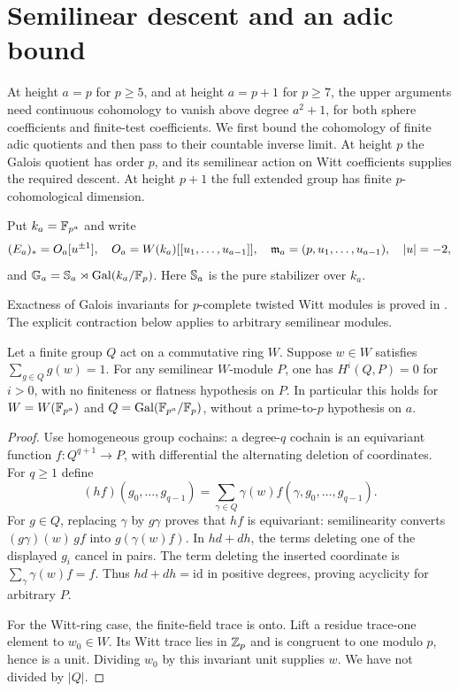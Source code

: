 \section{Semilinear descent and an adic bound}\label{sec:adic}
At height $a=p$ for $p\geq5$, and at height $a=p+1$ for $p\geq7$,
the upper arguments need continuous cohomology to vanish above degree
$a^2+1$, for both sphere coefficients
and finite-test coefficients. We first bound the cohomology of finite
adic quotients and then pass to their countable inverse limit. At height
$p$ the Galois quotient has order $p$, and its semilinear action on Witt
coefficients supplies the required descent. At height $p+1$ the full
extended group has finite $p$-cohomological dimension.

Put $k_a=\mathbb F_{p^a}$ and write
\[
 (E_a)_*=O_a[u^{\pm1}],\quad
 O_a=W(k_a)[[u_1,\ldots,u_{a-1}]],\quad
 \mathfrak m_a=(p,u_1,\ldots,u_{a-1}),\quad |u|=-2,
\]
and $\mathbb G_a=\mathbb S_a\rtimes\operatorname{Gal}(k_a/\mathbb F_p)$. Here $\mathbb S_a$ is the
pure stabilizer over $k_a$.

Exactness of Galois invariants for $p$-complete twisted Witt modules is
proved in \cite[Lemma~1.14]{goerss-hopkins2020}. The explicit contraction
below applies to arbitrary semilinear modules.

\begin{lemma}\label{lem:semilinear}
Let a finite group $Q$ act on a commutative ring $W$. Suppose
$w\in W$ satisfies $\sum_{g\in Q}g(w)=1$. For any semilinear
$W$-module $P$, one has $H^i(Q,P)=0$ for $i>0$, with no finiteness
or flatness hypothesis on $P$.
In particular this holds for $W=W(\mathbb F_{p^a})$ and
$Q=\operatorname{Gal}(\mathbb F_{p^a}/\mathbb F_p)$, without a prime-to-$p$ hypothesis on $a$.
\end{lemma}
\begin{proof}
Use homogeneous group cochains: a degree-$q$ cochain is an equivariant
function $f:Q^{q+1}\to P$, with differential the alternating deletion
of coordinates. For $q\geq1$ define
\[
 (hf)(g_0,\ldots,g_{q-1})
   =\sum_{\gamma\in Q}\gamma(w)f(\gamma,g_0,\ldots,g_{q-1}).
\]
For $g\in Q$, replacing $\gamma$ by $g\gamma$ proves that $hf$ is equivariant:
semilinearity converts $(g\gamma)(w)\,g f$ into
$g(\gamma(w)f)$. In $hd+dh$, the terms deleting one of the displayed
$g_i$ cancel in pairs. The term deleting the inserted coordinate is
$\sum_\gamma\gamma(w)f=f$. Thus $hd+dh=\mathrm{id}$ in positive
degrees, proving acyclicity for arbitrary $P$.

For the Witt-ring case, the finite-field trace is onto. Lift a residue
trace-one element to $w_0\in W$. Its Witt trace lies in $\mathbb Z_p$ and is
congruent to one modulo $p$, hence is a unit. Dividing $w_0$ by this
invariant unit supplies $w$. We have not divided by $|Q|$.
\end{proof}

